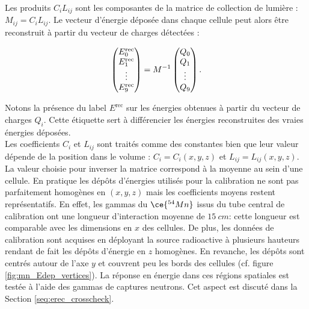  Les produits $C_iL_{ij}$ sont les composantes de la matrice de \og collection de lumière\fg{} : $M_{ij} = C_iL_{ij}$. Le vecteur d'énergie déposée dans chaque cellule peut alors être reconstruit à partir du vecteur de charges détectées :

\begin{equation}
\label{eq:energy_reconstruction}
\left( \begin{matrix}
  E_0^{\text{rec}} \\
  E_1^{\text{rec}} \\
  \vdots \\
  E_9^{\text{rec}}
 \end{matrix}\right)
=
M^{-1}
\left( \begin{matrix}
  Q_0 \\
  Q_1 \\
  \vdots \\
  Q_9

 \end{matrix}\right).\\
\end{equation}

\bigbreak

Notons la présence du label $E^{\text{rec}}$ sur les énergies obtenues à partir du vecteur de charges $Q_i$. Cette étiquette sert à différencier les énergies reconstruites des \og vraies\fg{} énergies déposées.\\

Les coefficients $C_i$ et $L_{ij}$ sont traités comme des constantes bien que leur valeur dépende de la position dans le volume : $C_i = C_i(x,y,z)$ et $L_{ij} = L_{ij}(x,y,z)$. La valeur choisie pour inverser la matrice correspond à la moyenne au sein d'une cellule. En pratique les dépôts d'énergies utilisés pour la calibration ne sont pas parfaitement homogènes en $(x,y,z)$ mais les coefficients moyens restent représentatifs. En effet, les gammas du $\ce{^{54}Mn}$ issus du tube central de calibration ont une longueur d'interaction moyenne de $\SI{15}{cm}$: cette longueur est comparable avec les dimensions en $x$ des cellules. De plus, les données de calibration sont acquises en déployant la source radioactive à plusieurs hauteurs rendant de fait les dépôts d'énergie en $z$ homogènes. En revanche, les dépôts sont centrés autour de l'axe $y$ et couvrent peu les bords des cellules (cf. figure \ref{fig:mn_Edep_vertices}). La réponse en énergie dans ces régions spatiales est testée à l'aide des gammas de captures neutrons. Cet aspect est discuté dans la Section \ref{seq:erec_crosscheck}.\\

